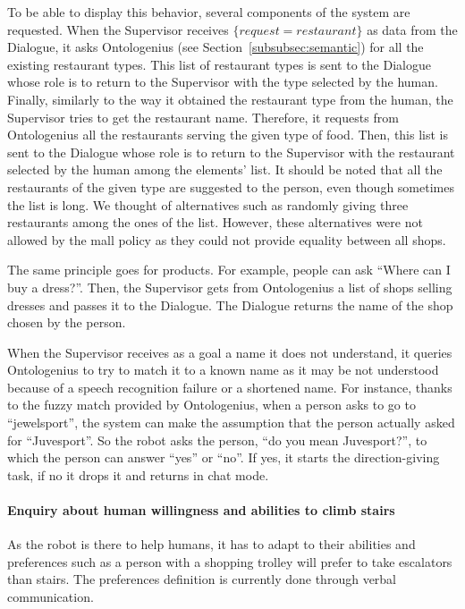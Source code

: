 \documentclass[a4paper,11pt,twoside]{StyleThese}
\begin{document}
To be able to display this behavior, several components of the system are requested. When the Supervisor receives $\{request=restaurant\}$ as data from the Dialogue, it asks Ontologenius (see Section~\ref{subsubsec:semantic}) for all the existing restaurant types. This list of restaurant types is sent to the Dialogue whose role is to return to the Supervisor with the type selected by the human. Finally, similarly to the way it obtained the restaurant type from the human, the Supervisor tries to get the restaurant name. Therefore, it requests from Ontologenius all the restaurants serving the given type of food. Then, this list is sent to the Dialogue whose role is to return to the Supervisor with the restaurant selected by the human among the elements' list. It should be noted that all the restaurants of the given type are suggested to the person, even though sometimes the list is long. We thought of alternatives such as randomly giving three restaurants among the ones of the list. However, these alternatives were not allowed by the mall policy as they could not provide equality between all shops. 

The same principle goes for products. For example, people can ask ``Where can I buy a dress?''. Then, the Supervisor gets from Ontologenius a list of shops selling dresses and passes it to the Dialogue. The Dialogue returns the name of the shop chosen by the person.

When the Supervisor receives as a goal a name it does not understand, it queries Ontologenius to try to match it to a known name as it may be not understood because of a speech recognition failure or a shortened name. For instance, thanks to the fuzzy match provided by Ontologenius, when a person asks to go to ``jewelsport'', the system can make the assumption that the person actually asked for ``Juvesport''. So the robot asks the person, ``do you mean Juvesport?'', to which the person can answer ``yes'' or ``no''. If yes, it starts the direction-giving task, if no it drops it and returns in chat mode.

\paragraph{Enquiry about human willingness and abilities to climb stairs}
As the robot is there to help humans, it has to adapt to their abilities and preferences such as a person with a shopping trolley will prefer to take escalators than stairs. The preferences definition is currently done through verbal communication.
\end{document}
